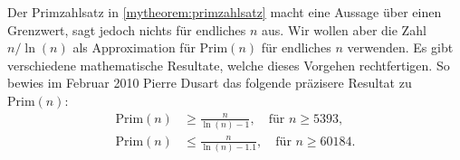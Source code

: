 \begin{myexcursion}\label{myexcursion:finiteN}
	Der Primzahlsatz in \cref{mytheorem:primzahlsatz} macht eine Aussage über einen Grenzwert, sagt jedoch nichts für endliches $n$ aus. Wir wollen aber die Zahl $n/\ln(n)$ als Approximation für $\text{Prim}(n)$ für endliches $n$ verwenden. Es gibt verschiedene mathematische Resultate, welche dieses Vorgehen rechtfertigen. So bewies im Februar 2010\cite{EstimatePrimes} Pierre Dusart das folgende präzisere Resultat zu $\text{Prim}(n)$:
	\begin{align}
		\text{Prim}(n) & \geq \frac{n}{\ln(n) - 1}, \quad\text{für } n\geq 5393,    \\
		\text{Prim}(n) & \leq \frac{n}{\ln(n) - 1.1}, \quad\text{für } n\geq 60184.
	\end{align}
\end{myexcursion}

%

